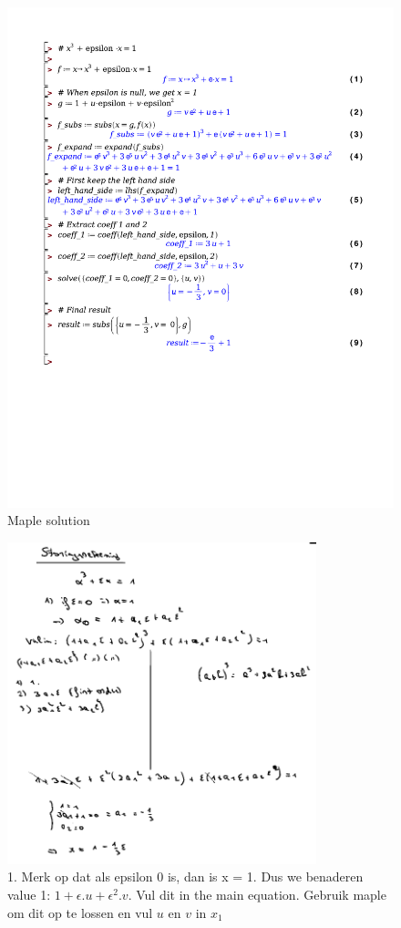 \documentclass[a4paper]{report}
\begin{document}
\begin{figure}[!htbp]
	\centering
	\includegraphics[width=\textwidth]{./storing.pdf}
	\caption{Maple solution}
	\label{sol:storing}
\end{figure}

\begin{figure}[htbp!]
	\centering
	\includegraphics[width=0.8\textwidth]{assets/storing_solution.png}
	\caption{1. Merk op dat als epsilon 0 is, dan is x = 1. Dus we benaderen value 1: $1 + \epsilon . u + \epsilon^2 . v$. Vul dit in the main equation. Gebruik maple om dit op te lossen en vul $u$ en $v$ in $x_1$}
	\label{fig:storing_solution}
\end{figure}
\end{document}
